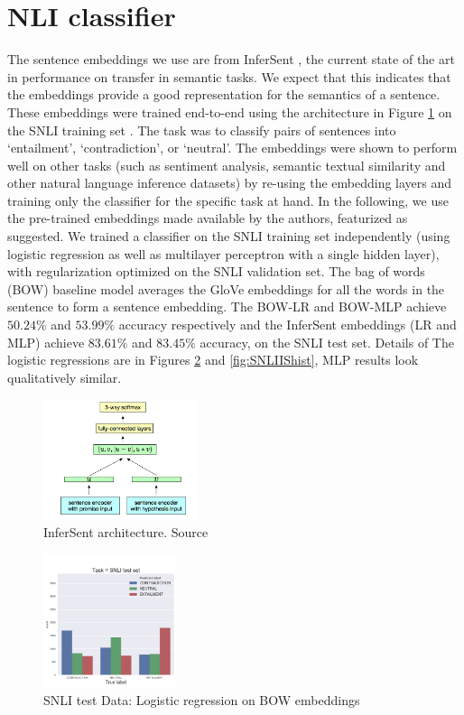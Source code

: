 \documentclass[10pt,letterpaper]{article}
\begin{document}
\section{NLI classifier}
The sentence embeddings we use are from InferSent \citep{Conneau:2017uf}, the current state of the art in performance on transfer in semantic tasks. We expect that this indicates that the embeddings provide a good representation for the semantics of a sentence. These embeddings were trained end-to-end using the architecture in Figure \ref{fig:arch} on the SNLI training set \citep{snli:emnlp2015}. The task was to classify pairs of sentences into `entailment', `contradiction', or `neutral'. The embeddings were shown to perform well on other tasks (such as sentiment analysis, semantic textual similarity and other natural language inference datasets) by re-using the embedding layers and training only the classifier for the specific task at hand. In the following, we use the pre-trained embeddings made available by the authors, featurized as suggested. We trained a classifier on the SNLI training set independently (using logistic regression as well as multilayer perceptron with a single hidden layer), with regularization optimized on the SNLI validation set. The bag of words (BOW) baseline model averages the GloVe embeddings for all the words in the sentence to form a sentence embedding. The BOW-LR and BOW-MLP achieve $50.24\%$ and $53.99\%$ accuracy respectively and the InferSent embeddings (LR and MLP) achieve $83.61\%$ and $83.45\%$ accuracy, on the SNLI test set. Details of The logistic regressions are in Figures \ref{fig:SNLIBOWhist} and \ref{fig:SNLIIShist}, MLP results look qualitatively similar.

\begin{figure}[ht!]
\centering
\includegraphics[width=0.4\textwidth]{InferSent_arch.png}
\caption{InferSent architecture. Source \citet{Conneau:2017uf}}
\label{fig:arch}
\end{figure}

\begin{figure}[ht!]
\centering
\includegraphics[width=0.35\textwidth]{SNLIBOWLogRegHistAll.png}
\caption{SNLI test Data: Logistic regression on BOW embeddings}
\label{fig:SNLIBOWhist}
\end{figure}
\end{document}
